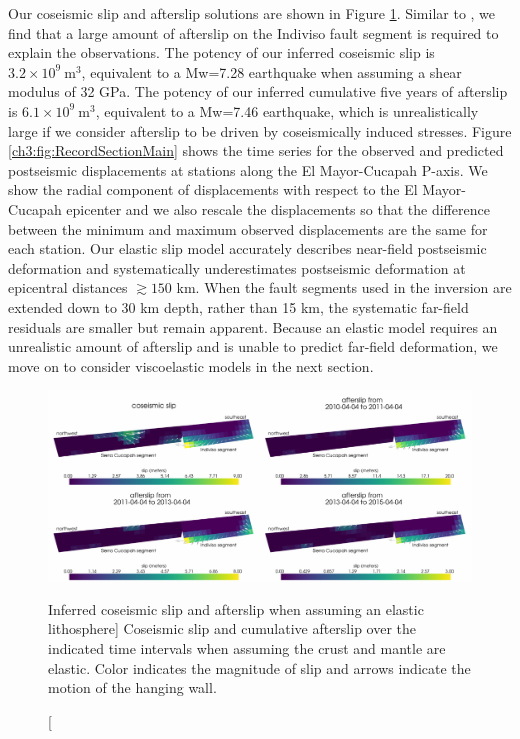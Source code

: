 Our coseismic slip and afterslip solutions are shown in Figure
\ref{ch3:fig:ElasticSlip}.  Similar to \citet{Rollins2015}, we find
that a large amount of afterslip on the Indiviso fault segment is
required to explain the observations. The potency of our inferred
coseismic slip is $3.2\times10^9\ \mathrm{m}^3$, equivalent to a
Mw=7.28 earthquake when assuming a shear modulus of 32 GPa.  The
potency of our inferred cumulative five years of afterslip is
$6.1\times10^9\ \mathrm{m}^3$, equivalent to a Mw=7.46 earthquake,
which is unrealistically large if we consider afterslip to be driven
by coseismically induced stresses.  Figure
\ref{ch3:fig:RecordSectionMain} shows the time series for the observed
and predicted postseismic displacements at stations along the El
Mayor-Cucapah P-axis.  We show the radial component of displacements
with respect to the El Mayor-Cucapah epicenter and we also rescale the
displacements so that the difference between the minimum and maximum
observed displacements are the same for each station.  Our elastic
slip model accurately describes near-field postseismic deformation and
systematically underestimates postseismic deformation at epicentral
distances ${\gtrsim}150$ km.  When the fault segments used in the
inversion are extended down to 30 km depth, rather than 15 km, the
systematic far-field residuals are smaller but remain apparent.
Because an elastic model requires an unrealistic amount of afterslip
and is unable to predict far-field deformation, we move on to consider
viscoelastic models in the next section.

\begin{figure}
\includegraphics[scale=0.9]{ch3/figures/2016jb013114-p06}
\caption
[Inferred coseismic slip and afterslip when assuming an elastic
lithosphere]
{Coseismic slip and cumulative afterslip over the indicated
time intervals when assuming the crust and mantle are elastic.  Color
indicates the magnitude of slip and arrows indicate the motion of the
hanging wall.}
\label{ch3:fig:ElasticSlip}
\end{figure}

